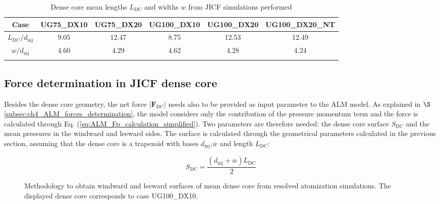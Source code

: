 \begin{table}[!h]
\centering
\caption{Dense core mean lengths $L_\mathrm{DC}$ and widths $w$ from JICF simulations performed}
\begin{tabular}{cccccc}
\thickhline
\textbf{Case} &  UG75\_DX10 & UG75\_DX20 & UG100\_DX10 & UG100\_DX20 &  UG100\_DX20\_NT \\
\hline
$L_\mathrm{DC}/d_\mathrm{inj}$ & 9.05 & 12.47 & 8.75 & 12.53 & 12.49 \\
$w/d_\mathrm{inj}$ & 4.60 & 4.29 & 4.62 & 4.28 & 4.24 \\
\thickhline
\end{tabular}
\label{tab:jicf_L_DC_values}
\end{table}






%

\subsection{Force determination in JICF dense core}

Besides the dense core geometry, the net force $|\textbf{F}_\mathrm{DC}|$ needs also to be provided as input parameter to the ALM model. As explained in $\S$\ref{subsec:ch4_ALM_forces_determination}, the model considers only the contribution of the pressure momentum term and the force is calculated through Eq. (\ref{eq:ALM_Fp_calculation_simplified}). Two parameters are therefore needed: the dense core surface $S_\mathrm{DC}$ and the mean pressures in the windward and leeward sides. The surface is calculated through the geometrical parameters calculated in the previous section, assuming that the dense core is a trapezoid with bases $d_\mathrm{inj}$,$\overline{w}$ and length $L_\mathrm{DC}$:

\begin{equation}
S_\mathrm{DC} = \frac{\left( d_\mathrm{inj} + \overline{w} \right) L_\mathrm{DC} }{2} 
\end{equation}

\begin{figure}[ht]
\centering
{}
\caption[Methodology to obtain windward and leeward surfaces of mean dense core from resolved atomization simulations]{Methodology to obtain windward and leeward surfaces of mean dense core from resolved atomization simulations. The displayed dense core corresponds to case UG100\_DX10.}
\label{fig:extraction_methodology_mean_DC}
\end{figure}

